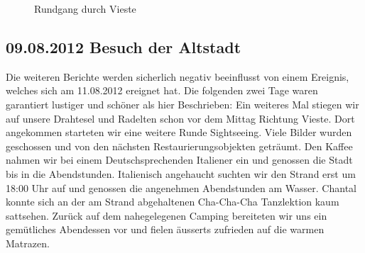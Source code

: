 \begin{figure}[h]
   \centering
   \quad
   \quad
   \quad
   \caption[Rundgang durch Vieste]{Rundgang durch Vieste}
\end{figure}
 
\subsection{09.08.2012 Besuch der Altstadt}
Die weiteren Berichte werden sicherlich negativ beeinflusst von einem Ereignis, welches sich am 11.08.2012 ereignet hat.
Die folgenden zwei Tage waren garantiert lustiger und schöner als hier Beschrieben:
Ein weiteres Mal stiegen wir auf unsere Drahtesel und Radelten schon vor dem Mittag Richtung Vieste.
Dort angekommen starteten wir eine weitere Runde Sightseeing.
Viele Bilder wurden geschossen und von den nächsten Restaurierungsobjekten geträumt.
Den Kaffee nahmen wir bei einem Deutschsprechenden Italiener ein und genossen die Stadt bis in die Abendstunden.
Italienisch angehaucht suchten wir den Strand erst um 18:00 Uhr auf und genossen die angenehmen Abendstunden am Wasser.
Chantal konnte sich an der am Strand abgehaltenen Cha-Cha-Cha Tanzlektion kaum sattsehen.
Zurück auf dem nahegelegenen Camping bereiteten wir uns ein gemütliches Abendessen vor und fielen äusserts zufrieden auf die warmen Matrazen.

